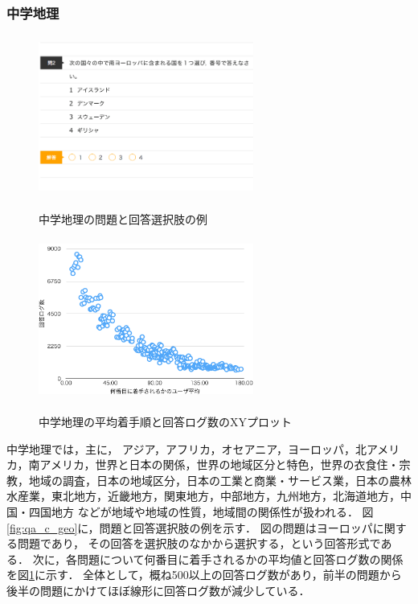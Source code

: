 \subsubsection{中学地理}
\begin{figure}[ht]
\begin{center}
	\includegraphics[width=200pt, height=150pt]{./img/qa_c_geo2.png}
	\caption{中学地理の問題と回答選択肢の例}
	\label{fig:qa_c_geo}
\endminipage\hfill
{}
	\includegraphics[width=200pt, height=150pt]{./img/stats_c_geo.pdf}
	\caption{中学地理の平均着手順と回答ログ数のXYプロット}
	\label{fig:stats_c_geo}
\endminipage\hfill
\end{center}
\end{figure}
中学地理では，主に，
アジア，アフリカ，オセアニア，ヨーロッパ，北アメリカ，南アメリカ，世界と日本の関係，世界の地域区分と特色，世界の衣食住・宗教，地域の調査，日本の地域区分，日本の工業と商業・サービス業，日本の農林水産業，東北地方，近畿地方，関東地方，中部地方，九州地方，北海道地方，中国・四国地方
などが地域や地域の性質，地域間の関係性が扱われる．
図\ref{fig:qa_c_geo}に，問題と回答選択肢の例を示す．
図の問題はヨーロッパに関する問題であり，
その回答を選択肢のなかから選択する，という回答形式である．
次に，各問題について何番目に着手されるかの平均値と回答ログ数の関係を図\ref{fig:stats_c_geo}に示す．
全体として，概ね500以上の回答ログ数があり，前半の問題から後半の問題にかけてほぼ線形に回答ログ数が減少している．


